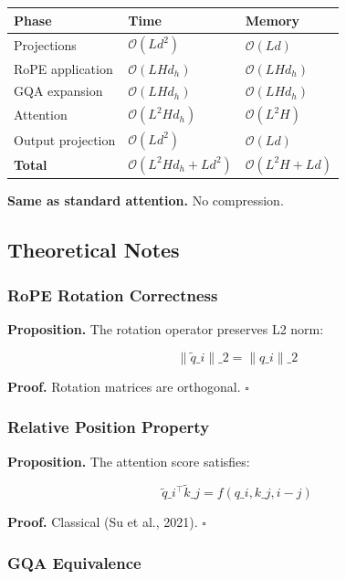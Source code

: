 \begin{table}[H]
\centering
\small
\begin{tabular}{lll}
\toprule
\textbf{Phase} & \textbf{Time} & \textbf{Memory} \\
\midrule
Projections & $\mathcal{O}(L d^2)$ & $\mathcal{O}(L d)$ \\
RoPE application & $\mathcal{O}(L H d_h)$ & $\mathcal{O}(L H d_h)$ \\
GQA expansion & $\mathcal{O}(L H d_h)$ & $\mathcal{O}(L H d_h)$ \\
Attention & $\mathcal{O}(L^2 H d_h)$ & $\mathcal{O}(L^2 H)$ \\
Output projection & $\mathcal{O}(L d^2)$ & $\mathcal{O}(L d)$ \\
\textbf{Total} & $\mathcal{O}(L^2 H d_h + L d^2)$ & $\mathcal{O}(L^2 H + L d)$ \\
\bottomrule
\end{tabular}
\end{table}

\textbf{Same as standard attention.} No compression.

\subsection{Theoretical Notes}

\subsubsection{RoPE Rotation Correctness}

\textbf{Proposition.} The rotation operator preserves L2 norm:

\[
\|\tilde{q}\_i\|\_2 = \|q\_i\|\_2
\tag{4.1}
\]

\textbf{Proof.} Rotation matrices are orthogonal. $\square$

\subsubsection{Relative Position Property}

\textbf{Proposition.} The attention score satisfies:

\[
\tilde{q}\_i^\top \tilde{k}\_j = f(q\_i, k\_j, i - j)
\tag{4.2}
\]

\textbf{Proof.} Classical (Su et al., 2021). $\square$

\subsubsection{GQA Equivalence}

